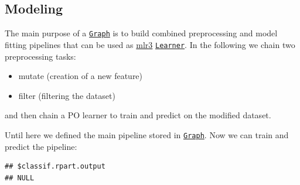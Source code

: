 \documentclass[]{article}
\newenvironment{Shaded}{\begin{snugshade}}{\end{snugshade}}
\newcommand{\DataTypeTok}[1]{\textcolor[rgb]{0.13,0.29,0.53}{#1}}
\newcommand{\KeywordTok}[1]{\textcolor[rgb]{0.13,0.29,0.53}{\textbf{#1}}}
\newcommand{\NormalTok}[1]{#1}
\newcommand{\OperatorTok}[1]{\textcolor[rgb]{0.81,0.36,0.00}{\textbf{#1}}}
\newcommand{\StringTok}[1]{\textcolor[rgb]{0.31,0.60,0.02}{#1}}
\providecommand{\tightlist}{%
  \setlength{\itemsep}{0pt}\setlength{\parskip}{0pt}}
\renewenvironment{Shaded} {\begin{snugshade}\small} {\end{snugshade}}
\begin{document}
\hypertarget{pipe-modeling}{%
\subsection{Modeling}\label{pipe-modeling}}

The main purpose of a \href{https://mlr3pipelines.mlr-org.com/reference/Graph.html}{\texttt{Graph}} is to build combined preprocessing and model fitting pipelines that can be used as \href{https://mlr3.mlr-org.com}{mlr3} \href{https://mlr3.mlr-org.com/reference/Learner.html}{\texttt{Learner}}.
In the following we chain two preprocessing tasks:

\begin{itemize}
\tightlist
\item
  mutate (creation of a new feature)
\item
  filter (filtering the dataset)
\end{itemize}

and then chain a PO learner to train and predict on the modified dataset.

\begin{Shaded}
\end{Shaded}

Until here we defined the main pipeline stored in \href{https://mlr3pipelines.mlr-org.com/reference/Graph.html}{\texttt{Graph}}.
Now we can train and predict the pipeline:

\begin{Shaded}
\end{Shaded}

\begin{verbatim}
## $classif.rpart.output
## NULL
\end{verbatim}
\end{document}
